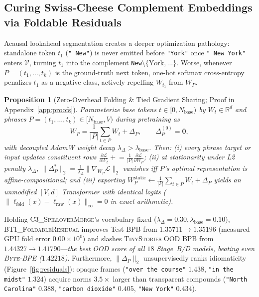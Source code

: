 \documentclass[11pt,a4paper]{article}
\newtheorem{proposition}{Proposition}
\begin{document}
\subsection{Curing Swiss-Cheese Complement Embeddings via Foldable Residuals}
Acausal lookahead segmentation creates a deeper optimization pathology: standalone token $t_1$ (\texttt{" New"}) is never emitted before \texttt{"York"} once \texttt{" New York"} enters $\mathcal{V}$, turning $t_1$ into the complement \texttt{New}$\setminus\{\text{York},\dots\}$. Worse, whenever $P=(t_1,\dots,t_k)$ is the ground-truth next token, one-hot softmax cross-entropy penalizes $t_1$ as a negative class, actively repelling $W_{t_1}$ from $W_P$.

\begin{proposition}[Zero-Overhead Folding \& Tied Gradient Sharing; Proof in Appendix~\ref{app:proofs}]
\label{prop:foldable}
Parameterize base tokens $t \in [0, N_{\text{base}})$ by $W_t \in \mathbb{R}^d$ and phrases $P=(t_1,\dots,t_k) \in [N_{\text{base}}, V)$ during pretraining as
\begin{equation}
    W_P = \frac{1}{|P|}\sum_{t \in P} W_t + \Delta_P, \qquad \Delta_P^{(0)} = \mathbf{0},
\end{equation}
with decoupled AdamW weight decay $\lambda_\Delta > \lambda_{\text{base}}$. Then: (i) every phrase target or input updates constituent rows $\frac{\partial \mathcal{L}}{\partial W_t} \mathrel{+}= \frac{1}{|P|}\frac{\partial \mathcal{L}}{\partial W_P}$; (ii) at stationarity under L2 penalty $\lambda_\Delta$, $\|\Delta_P^*\|_2 = \frac{1}{\lambda_\Delta}\|\nabla_{W_P}\mathcal{L}\|_2$ vanishes iff $P$'s optimal representation is affine-compositional; and (iii) exporting $W_P^{\text{static}} \leftarrow \frac{1}{|P|}\sum_{t\in P}W_t + \Delta_P$ yields an unmodified $[V, d]$ Transformer with identical logits ($\|\ell_{\text{fold}}(x) - \ell_{\text{raw}}(x)\|_\infty = 0$ in exact arithmetic).
\end{proposition}

Holding \textsc{C3\_SpilloverMerge}'s vocabulary fixed ($\lambda_\Delta=0.30, \lambda_{\text{base}}=0.10$), \textsc{BT1\_Foldable\-Residual} improves Test BPB from $1.35711 \to \mathbf{1.35196}$ (measured GPU fold error $0.00 \times 10^0$) and slashes \textsc{TinyStories} OOD BPB from $1.44327 \to \mathbf{1.41790}$---\emph{the best OOD score of all $18$ Stage~B/D models, beating even \textsc{Byte-BPE} ($1.42218$)}. Furthermore, $\|\Delta_P\|_2$ unsupervisedly ranks idiomaticity (Figure~\ref{fig:residuals}): opaque frames (\texttt{"over the course"} $1.438$, \texttt{"in the midst"} $1.324$) acquire norms $3.5\times$ larger than transparent compounds (\texttt{"North Carolina"} $0.388$, \texttt{"carbon dioxide"} $0.405$, \texttt{"New York"} $0.434$).
\end{document}
